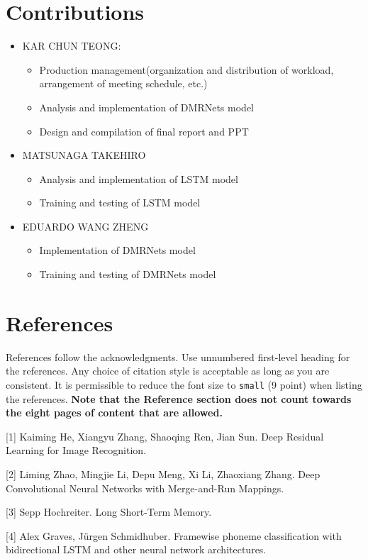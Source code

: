 \documentclass{article}
\begin{document}
\section{Contributions}
\begin{itemize}
\item KAR CHUN TEONG: 
\begin{itemize}
\item Production management(organization and distribution of workload, arrangement of meeting schedule, etc.)
\item Analysis and implementation of DMRNets model
\item Design and compilation of final report and PPT
\end{itemize}
\item MATSUNAGA TAKEHIRO
\begin{itemize}
\item Analysis and implementation of LSTM model
\item Training and testing of LSTM model
\end{itemize}
\item EDUARDO WANG ZHENG
\begin{itemize}
\item Implementation of DMRNets model
\item Training and testing of DMRNets model
\end{itemize}
\end{itemize}

\section*{References}

References follow the acknowledgments. Use unnumbered first-level heading for
the references. Any choice of citation style is acceptable as long as you are
consistent. It is permissible to reduce the font size to \verb+small+ (9 point)
when listing the references.
{\bf Note that the Reference section does not count towards the eight pages of content that are allowed.}
\medskip

\small

[1] Kaiming He, Xiangyu Zhang, Shaoqing Ren, Jian Sun. Deep Residual Learning for Image Recognition.

[2] Liming Zhao, Mingjie Li, Depu Meng, Xi Li, Zhaoxiang Zhang. Deep Convolutional Neural Networks with Merge-and-Run Mappings.

[3] Sepp Hochreiter. Long Short-Term Memory. 

[4] Alex Graves, Jürgen Schmidhuber. Framewise phoneme classification with bidirectional LSTM and other neural network architectures. 
\end{document}
